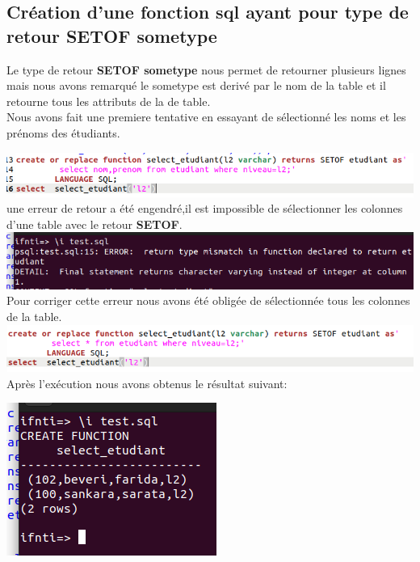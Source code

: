 \documentclass[12pt,b5paper]{article}
\begin{document}
\subsection{Création d'une fonction sql ayant pour type de retour \textbf{SETOF sometype}}

Le type de retour \textbf{SETOF sometype} nous permet de retourner plusieurs lignes mais nous avons remarqué le sometype est derivé par le nom de la table et il retourne tous les attributs de la de table.\\

Nous avons fait une premiere tentative en essayant de sélectionné les noms et les prénoms des étudiants.\\
 \newpage

\includegraphics[scale=0.5]{ca}\\
 une erreur de retour a été engendré,il est impossible de sélectionner les colonnes d'une table avec le retour \textbf{SETOF}.\\
 
 
\includegraphics[scale=0.5]{erreur_setop}\\

Pour corriger cette erreur nous avons été obligée de sélectionnée tous les colonnes de la table.\\
 
 
 
 
\includegraphics[scale=0.5]{select}\\

 Après l’exécution nous avons obtenus le résultat suivant:
 
\begin{center}
\includegraphics[scale=0.5]{resul_setof}\\
\end{center}
\newpage
\end{document}
